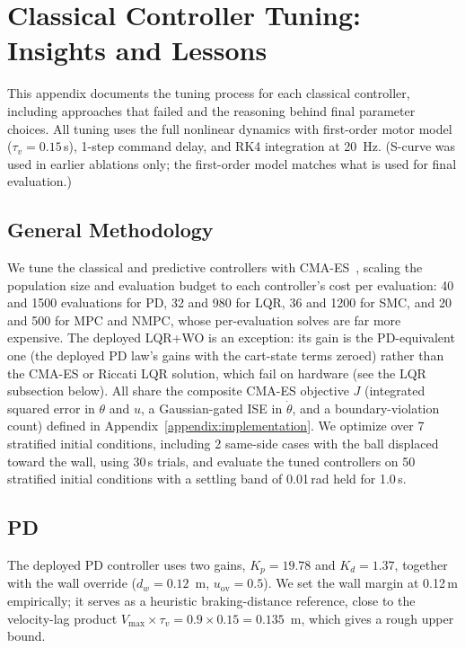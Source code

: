\section{Classical Controller Tuning: Insights and Lessons}
\label{appendix:tuning_insights}

This appendix documents the tuning process for each classical
controller, including approaches that failed and the reasoning
behind final parameter choices.
All tuning uses the full nonlinear dynamics with first-order motor
model ($\tau_v = 0.15$\,s), 1-step command delay, and RK4 integration
at 20~Hz. (S-curve was used in earlier ablations only; the first-order
model matches what is used for final evaluation.)

\subsection{General Methodology}

We tune the classical and predictive controllers with
CMA-ES~\cite{hansen2016cma}, scaling the population size and evaluation
budget to each controller's cost per evaluation: 40 and 1500 evaluations
for PD, 32 and 980 for LQR, 36 and 1200 for SMC, and 20 and 500 for MPC
and NMPC, whose per-evaluation solves are far more expensive. The deployed LQR+WO is an
exception: its gain is the PD-equivalent one (the deployed PD law's gains with
the cart-state terms zeroed) rather than the CMA-ES or Riccati LQR solution,
which fail on hardware (see the LQR subsection below). All share the composite CMA-ES objective $J$ (integrated squared error in
$\theta$ and $u$, a Gaussian-gated ISE in $\dot\theta$, and a
boundary-violation count) defined in Appendix~\ref{appendix:implementation}.
We optimize over
7 stratified initial conditions, including 2 same-side cases with the ball
displaced toward the wall, using 30\,s trials, and evaluate the tuned
controllers on 50 stratified initial conditions with a settling band of
0.01\,rad held for 1.0\,s.

\subsection{PD}

The deployed PD controller uses two gains, $K_p=19.78$ and $K_d=1.37$, together with the
wall override ($d_w=0.12$~m, $u_\text{ov}=0.5$). We set the wall margin at
0.12\,m empirically; it serves as a heuristic braking-distance reference,
close to the velocity-lag product
$V_\text{max} \times \tau_v = 0.9 \times 0.15 = 0.135$~m, which gives a
rough upper bound.


